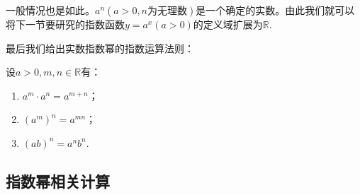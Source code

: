 \documentclass[lang=cn,math=cm,chinesefont=nofont,11pt,scheme=chinese,twocol]{elegantbook}
\begin{document}
一般情况也是如此。$a^n(a>0,n\text{为无理数})$是一个确定的实数。由此我们就可以将下一节要研究的指数函数$y=a^x(a>0)$的定义域扩展为$\mathbb{R}$.

最后我们给出实数指数幂的指数运算法则：

\begin{property}\label{LawOfIndices3}
  设$a>0,m,n\in\mathbb{R}$有：
  \begin{enumerate}
    \item $a^m\cdot a^n=a^{m+n}$；
    \item $(a^m)^n=a^{mn}$；
    \item $(ab)^n=a^nb^n$.
    \end{enumerate}
\end{property}

\subsection{指数幂相关计算}
\end{document}
